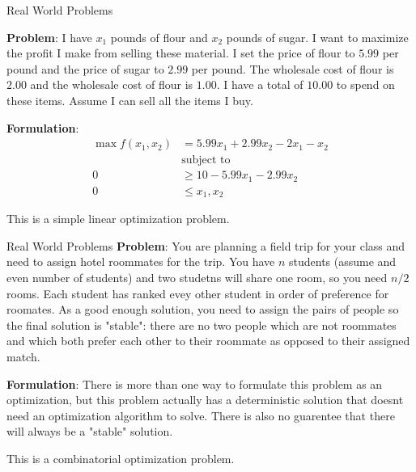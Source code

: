 \documentclass[aspectratio=169]{beamer}
\begin{document}
\begin{frame}{Real World Problems}

    \textbf{Problem}: I have $x_1$ pounds of flour and $x_2$ pounds of sugar. I want to maximize the profit I make from selling these material. I set the price of flour to $5.99$ per pound and the price of sugar to $2.99$ per pound. The wholesale cost of flour is $2.00$ and the wholesale cost of flour is $1.00$. I have a total of $10.00$ to spend on these items. Assume I can sell all the items I buy.

    \vspace{\baselineskip}

    \textbf{Formulation}:
    \begin{align}
        \max f(x_1, x_2) & = 5.99x_1 + 2.99x_2 - 2x_1 - x_2 \\
                         & \text{subject to}                \\
        0                & \ge 10 -5.99x_1 - 2.99x_2        \\
        0                & \le x_1, x_2
    \end{align}

    \begin{center}
        This is a simple linear optimization problem.
    \end{center}

\end{frame}


\begin{frame}{Real World Problems}
    \textbf{Problem}: You are planning a field trip for your class and need to assign hotel roommates for the trip. You have $n$ students (assume and even number of students) and two studetns will share one room, so you need $n/2$ rooms. Each student has ranked evey other student in order of preference for roomates. As a good enough solution, you need to assign the pairs of people so the final solution is "stable": there are no two people which are not roommates and which both prefer each other to their roommate as opposed to their assigned match.

    \vspace{\baselineskip}

    \textbf{Formulation}: There is more than one way to formulate this problem as an optimization, but this problem actually has a deterministic solution that doesnt need an optimization algorithm to solve. There is also no guarentee that there will always be a "stable" solution.

    \begin{center}
        This is a combinatorial optimization problem.
    \end{center}

\end{frame}
\end{document}
